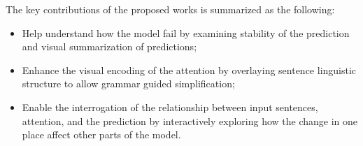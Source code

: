 The key contributions of the proposed works is summarized as the following:
\begin{itemize}
    \item Help understand how the model fail by examining stability of the prediction and visual summarization of predictions;

    \item Enhance the visual encoding of the attention by overlaying sentence linguistic structure to allow grammar guided simplification;

    \item Enable the interrogation of the relationship between input sentences, attention, and the prediction by interactively exploring how the change in one place affect other parts of the model.

\end{itemize}
%






%
%

